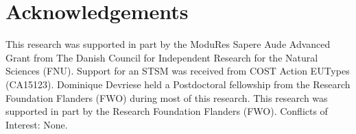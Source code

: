 \documentclass{jfp}
\begin{document}

\section*{Acknowledgements}
  This research was supported in part by the ModuRes Sapere Aude Advanced Grant
  from The Danish Council for Independent Research for the Natural Sciences (FNU).
  Support for an STSM was received from COST Action EUTypes (CA15123).
  Dominique Devriese held a Postdoctoral fellowship from the Research Foundation
  Flanders (FWO) during most of this research.
  This research was supported in part by the Research Foundation Flanders (FWO).
  Conflicts of Interest: None.





\clearpage
\appendix


\label{lastpage01}
\end{document}
